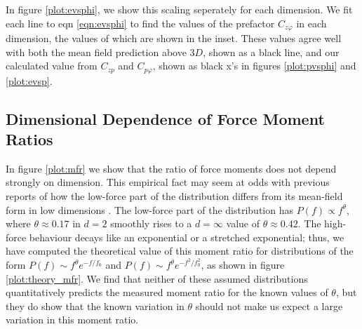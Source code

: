 In figure \ref{plot:evsphi}, we show this scaling seperately for each dimension. We fit each line to eqn \ref{eqn:evsphi} to find the values of the prefactor $C_{z\varphi}$ in each dimension, the values of which are shown in the inset. These values agree well with both the mean field prediction above $3D$, shown as a black line, and our calculated value from $C_{zp}$ and $C_{p\varphi}$, shown as black x's in figures \ref{plot:pvsphi} 
and \ref{plot:evsp}.

%
\subsection{Dimensional Dependence of Force Moment Ratios}
In figure \ref{plot:mfr} we show that the ratio of force moments does not depend strongly on dimension. This empirical fact may seem at odds with previous reports of how the low-force part of the distribution differs from its mean-field form in low dimensions \cite{charbonneau_jamming_2015,mueth_force_1998}. The low-force part of the distribution has $P(f) \propto f^\theta$, where $\theta\approx 0.17$ in $d=2$ smoothly rises to a $d=\infty$ value of $\theta \approx 0.42$. The high-force behaviour decays like an exponential or a stretched exponential; thus, we have computed the theoretical value of this moment ratio for distributions of the form $P(f) \sim f^\theta e^{-f /f_0}$ and $P(f) \sim f^\theta e^{-f^2 /f_0^2}$, as shown in figure \ref{plot:theory_mfr}. We find that neither of these assumed distributions quantitatively predicts the measured moment ratio for the known values of $\theta$, but they do show that the known variation in $\theta$ should not make us expect a large variation in this moment ratio.




